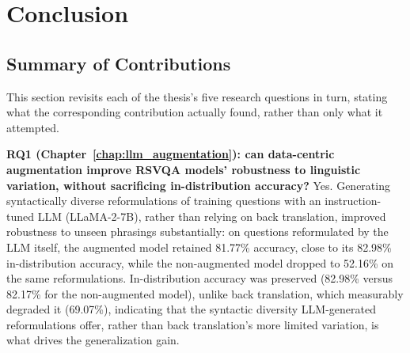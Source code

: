 
\chapter{Conclusion}
\label{chap:conclusion}

\startcontents[chapters]

\section{Summary of Contributions}
\label{sec:conclusion_summary}

This section revisits each of the thesis's five research questions in turn, stating what the corresponding contribution actually found, rather than only what it attempted.

\textbf{RQ1 (Chapter~\ref{chap:llm_augmentation}): can data-centric augmentation improve RSVQA models' robustness to linguistic variation, without sacrificing in-distribution accuracy?} Yes. Generating syntactically diverse reformulations of training questions with an instruction-tuned LLM (LLaMA-2-7B), rather than relying on back translation, improved robustness to unseen phrasings substantially: on questions reformulated by the LLM itself, the augmented model retained 81.77\% accuracy, close to its 82.98\% in-distribution accuracy, while the non-augmented model dropped to 52.16\% on the same reformulations. In-distribution accuracy was preserved (82.98\% versus 82.17\% for the non-augmented model), unlike back translation, which measurably degraded it (69.07\%), indicating that the syntactic diversity LLM-generated reformulations offer, rather than back translation's more limited variation, is what drives the generalization gain.

